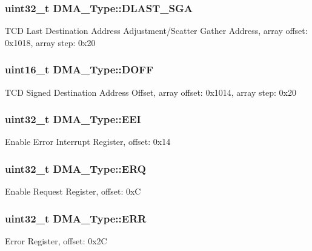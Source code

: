 \subsubsection[{\texorpdfstring{D\+L\+A\+S\+T\+\_\+\+S\+GA}{DLAST_SGA}}]{ uint32\+\_\+t D\+M\+A\+\_\+\+Type\+::\+D\+L\+A\+S\+T\+\_\+\+S\+GA}\hypertarget{structDMA__Type_af002f43e1ac832df5420754262d8dd61}{}\label{structDMA__Type_af002f43e1ac832df5420754262d8dd61}
T\+CD Last Destination Address Adjustment/\+Scatter Gather Address, array offset\+: 0x1018, array step\+: 0x20 
\subsubsection[{\texorpdfstring{D\+O\+FF}{DOFF}}]{ uint16\+\_\+t D\+M\+A\+\_\+\+Type\+::\+D\+O\+FF}\hypertarget{structDMA__Type_ac468a90e025787b52d04e6bcd4bb3b27}{}\label{structDMA__Type_ac468a90e025787b52d04e6bcd4bb3b27}
T\+CD Signed Destination Address Offset, array offset\+: 0x1014, array step\+: 0x20 
\subsubsection[{\texorpdfstring{E\+EI}{EEI}}]{ uint32\+\_\+t D\+M\+A\+\_\+\+Type\+::\+E\+EI}\hypertarget{structDMA__Type_ad36396daed0b605efbbca1034b25dca6}{}\label{structDMA__Type_ad36396daed0b605efbbca1034b25dca6}
Enable Error Interrupt Register, offset\+: 0x14 
\subsubsection[{\texorpdfstring{E\+RQ}{ERQ}}]{ uint32\+\_\+t D\+M\+A\+\_\+\+Type\+::\+E\+RQ}\hypertarget{structDMA__Type_a238b1b4eca36a89065db2194e939b150}{}\label{structDMA__Type_a238b1b4eca36a89065db2194e939b150}
Enable Request Register, offset\+: 0xC 
\subsubsection[{\texorpdfstring{E\+RR}{ERR}}]{ uint32\+\_\+t D\+M\+A\+\_\+\+Type\+::\+E\+RR}\hypertarget{structDMA__Type_afb6f9d066790021df0cf7aa335824381}{}\label{structDMA__Type_afb6f9d066790021df0cf7aa335824381}
Error Register, offset\+: 0x2C 
